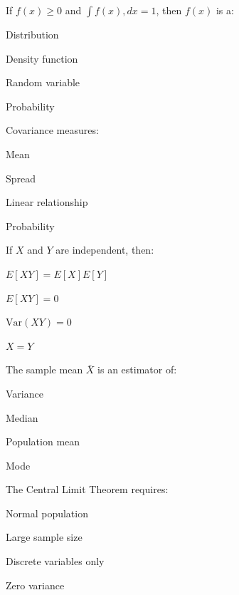 \documentclass{USTBExam}
\begin{document}
\begin{question}
If $f(x)\ge0$ and $\int f(x),dx=1$, then $f(x)$ is a:
\paren
\begin{choices}
\item Distribution
\item Density function
\item Random variable
\item Probability
\end{choices}
\end{question}

\begin{question}
Covariance measures:
\paren
\begin{choices}
\item Mean
\item Spread
\item Linear relationship
\item Probability
\end{choices}
\end{question}

\begin{question}
If $X$ and $Y$ are independent, then:
\paren
\begin{choices}
\item $E[XY]=E[X]E[Y]$
\item $E[XY]=0$
\item $\mathrm{Var}(XY)=0$
\item $X=Y$
\end{choices}
\end{question}

\begin{question}
The sample mean $\bar X$ is an estimator of:
\paren
\begin{choices}
\item Variance
\item Median
\item Population mean
\item Mode
\end{choices}
\end{question}

\begin{question}
The Central Limit Theorem requires:
\paren
\begin{choices}
\item Normal population
\item Large sample size
\item Discrete variables only
\item Zero variance
\end{choices}
\end{question}
\end{document}
